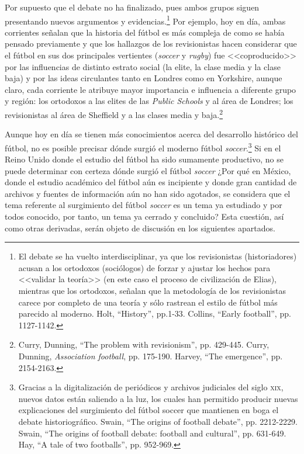 \documentclass[11pt,a5paper,twoside]{book} %
\begin{document}
Por supuesto que el debate no ha finalizado, pues ambos grupos siguen presentando
nuevos argumentos y evidencias.\footnote{El debate se ha vuelto interdisciplinar, ya que los revisionistas (historiadores) acusan a los ortodoxos (sociólogos) de forzar y ajustar los hechos para <<validar la teoría>> (en este caso el proceso de civilización de Elias), mientras que los ortodoxos, señalan que la metodología de los revisionistas carece por completo de una teoría y sólo rastrean el estilo de fútbol más parecido al moderno. Holt, ``History'', pp.1-33. Collins, ``Early football'', pp. 1127-1142.} Por ejemplo, hoy en día, ambas corrientes señalan que la historia del fútbol es más compleja de como se había pensado previamente y que los hallazgos
de los revisionistas hacen considerar que el fútbol en sus dos principales vertientes (\emph{soccer} y \emph{rugby}) fue <<coproducido>> por las influencias de distinto estrato social (la elite, la clase media y la clase baja) y por las ideas circulantes tanto en Londres como en Yorkshire, aunque claro, cada corriente le atribuye mayor importancia e influencia a diferente grupo y región: los ortodoxos a las elites de las \emph{Public Schools} y al área de Londres; los revisionistas al área de Sheffield y a las clases media y baja.\footnote{Curry, Dunning, ``The problem with revisionism'', pp. 429-445. Curry, Dunning, \emph{Association football}, pp. 175-190. Harvey, ``The emergence'', pp. 2154-2163.}

Aunque hoy en día se tienen más conocimientos acerca del desarrollo histórico del
fútbol, no es posible precisar dónde surgió el moderno fútbol \emph{soccer}.\footnote{Gracias a la digitalización de periódicos y archivos judiciales del siglo \textsc{xix}, nuevos datos están saliendo a la luz, los cuales han permitido producir nuevas explicaciones del surgimiento del fútbol soccer que mantienen en boga el debate historiográfico. Swain, ``The origins of football debate'', pp. 2212-2229. Swain, ``The origins of football debate: football and cultural'', pp. 631-649. Hay, ``A tale of two footballs'', pp. 952-969.} Si en el Reino Unido
donde el estudio del fútbol ha sido sumamente productivo, no se puede determinar con
certeza dónde surgió el fútbol \emph{soccer} ¿Por qué en México, donde el estudio académico del fútbol aún es incipiente y donde gran cantidad de archivos y fuentes de información aún no
han sido agotados, se considera que el tema referente al surgimiento del fútbol \emph{soccer} es un
tema ya estudiado y por todos conocido, por tanto, un tema ya cerrado y concluido? Esta
cuestión, así como otras derivadas, serán objeto de discusión en los siguientes apartados.
\end{document}
